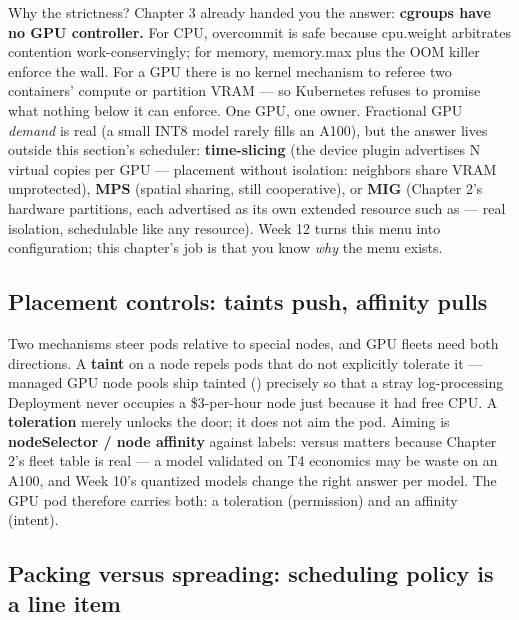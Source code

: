 Why the strictness? Chapter 3 already handed you the answer: \textbf{cgroups have no GPU controller.} For CPU, overcommit is safe because cpu.weight arbitrates contention work-conservingly; for memory, memory.max plus the OOM killer enforce the wall. For a GPU there is no kernel mechanism to referee two containers' compute or partition VRAM — so Kubernetes refuses to promise what nothing below it can enforce. One GPU, one owner. Fractional GPU \textit{demand} is real (a small INT8 model rarely fills an A100), but the answer lives outside this section's scheduler: \textbf{time-slicing} (the device plugin advertises N virtual copies per GPU — placement without isolation: neighbors share VRAM unprotected), \textbf{MPS} (spatial sharing, still cooperative), or \textbf{MIG} (Chapter 2's hardware partitions, each advertised as its own extended resource such as  — real isolation, schedulable like any resource). Week 12 turns this menu into configuration; this chapter's job is that you know \textit{why} the menu exists.

\subsection*{Placement controls: taints push, affinity pulls}

Two mechanisms steer pods relative to special nodes, and GPU fleets need both directions. A \textbf{taint} on a node repels pods that do not explicitly tolerate it — managed GPU node pools ship tainted () precisely so that a stray log-processing Deployment never occupies a \$3-per-hour node just because it had free CPU. A \textbf{toleration} merely unlocks the door; it does not aim the pod. Aiming is \textbf{nodeSelector / node affinity} against labels:  versus  matters because Chapter 2's fleet table is real — a model validated on T4 economics may be waste on an A100, and Week 10's quantized models change the right answer per model. The GPU pod therefore carries both: a toleration (permission) and an affinity (intent).

\subsection*{Packing versus spreading: scheduling policy is a line item}

